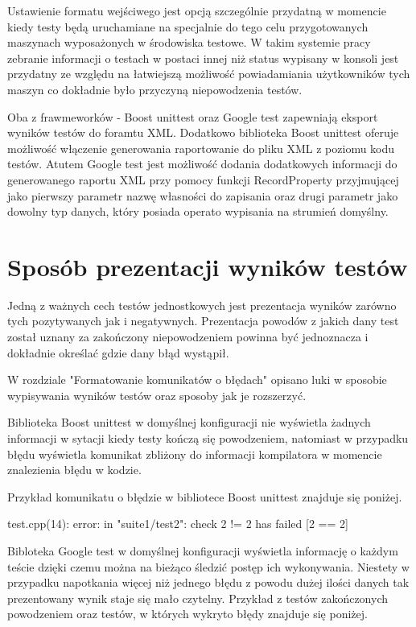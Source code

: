 \documentclass[12pt,a4paper,notitlepage]{report}
\begin{document}
Ustawienie formatu wejściwego jest opcją szczególnie przydatną w momencie kiedy testy będą uruchamiane na specjalnie do tego celu przygotowanych maszynach wyposażonych w środowiska testowe. W takim systemie pracy zebranie informacji o testach w postaci innej niż status wypisany w konsoli jest przydatny ze względu na łatwiejszą możliwość powiadamiania użytkowników tych maszyn co dokładnie było przyczyną niepowodzenia testów.

Oba z frawmeworków - Boost unittest oraz Google test zapewniają eksport wyników testów do foramtu XML. Dodatkowo biblioteka Boost unittest oferuje możliwość włączenie generowania raportowanie do pliku XML z poziomu kodu testów. Atutem Google test jest możliwość dodania dodatkowych informacji do generowanego raportu XML przy pomocy funkcji 	RecordProperty przyjmującej jako pierwszy parametr nazwę własności do zapisania oraz drugi parametr jako dowolny typ danych, który posiada operato wypisania na strumień domyślny.

\chapter{Sposób prezentacji wyników testów}

Jedną z ważnych cech testów jednostkowych jest prezentacja wyników zarówno tych pozytywanych jak i negatywnych. Prezentacja powodów z jakich dany test został uznany za zakończony niepowodzeniem powinna być jednoznacza i dokładnie określać gdzie dany błąd wystąpił.

W rozdziale "Formatowanie komunikatów o błędach" opisano luki w sposobie wypisywania wyników testów oraz sposoby jak je rozszerzyć.

Biblioteka Boost unittest w domyślnej konfiguracji nie wyświetla żadnych informacji w sytacji kiedy testy kończą się powodzeniem, natomiast w przypadku błędu wyświetla komunikat zbliżony do informacji kompilatora w momencie znalezienia błędu w kodzie.

Przykład komunikatu o błędzie w bibliotece Boost unittest znajduje się poniżej.

test.cpp(14): error: in "suite1/test2": check 2 != 2 has failed [2 == 2]

Bibloteka Google test w domyślnej konfiguracji wyświetla informację o każdym teście dzięki czemu można na bieżąco śledzić postęp ich wykonywania. Niestety w przypadku napotkania więcej niż jednego błędu z powodu dużej ilości danych tak prezentowany wynik staje się mało czytelny. Przykład z testów zakończonych powodzeniem oraz testów, w których wykryto błędy znajduje się poniżej.
\end{document}

